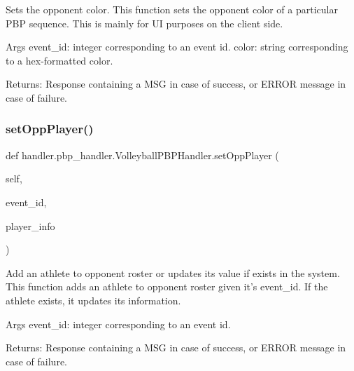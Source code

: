 \begin{DoxyVerb}Sets the opponent color.
This function sets the opponent color of a particular PBP sequence. This is mainly for UI purposes on the client side.

Args
    event_id: integer corresponding to an event id.
    color: string corresponding to a hex-formatted color.

Returns:
    Response containing a MSG in case of success, or ERROR message in case of failure.
\end{DoxyVerb}
 \mbox{\label{classhandler_1_1pbp__handler_1_1_volleyball_p_b_p_handler_ab6f1cfbd5900c8264ebc3d56982d111d}} 
\subsubsection{\texorpdfstring{set\+Opp\+Player()}{setOppPlayer()}}
{\footnotesize\ttfamily def handler.\+pbp\+\_\+handler.\+Volleyball\+P\+B\+P\+Handler.\+set\+Opp\+Player (\begin{DoxyParamCaption}\item[{}]{self,  }\item[{}]{event\+\_\+id,  }\item[{}]{player\+\_\+info }\end{DoxyParamCaption})}

\begin{DoxyVerb}Add an athlete to opponent roster or updates its value if exists in the system.
This function adds an athlete to opponent roster given it's event_id.
If the athlete exists, it updates its information.

Args
    event_id: integer corresponding to an event id.

Returns:
    Response containing a MSG in case of success, or ERROR message in case of failure.
\end{DoxyVerb}
 \mbox{\label{classhandler_1_1pbp__handler_1_1_volleyball_p_b_p_handler_aadd6ddad362e098ade44269a18ba56fe}} 
